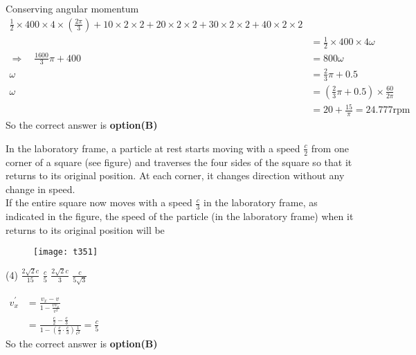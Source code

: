 \begin{questions}
\begin{answer}
	Conserving angular momentum\\
	$\begin{aligned} \frac{1}{2} \times 400 \times 4 \times\left(\frac{2 \pi}{3}\right)+10 \times 2 \times 2+20 \times 2 \times 2+30 \times 2 \times 2+40 \times 2 \times 2 \\ &=\frac{1}{2} \times 400 \times 4 \omega \\ \Rightarrow \quad \frac{1600}{3} \pi+400 &=800 \omega \\ \omega &=\frac{2}{3} \pi+0.5 \\ \omega &=\left(\frac{2}{3} \pi+0.5\right) \times \frac{60}{2 \pi} \\ &=20+\frac{15}{\pi}=24.777 \mathrm{rpm} \end{aligned}$\\
	So the correct answer is \textbf{option(B)}
\end{answer}
\begin{minipage}{\textwidth}
	\question In the laboratory frame, a particle at rest starts moving with a speed $\frac{c}{2}$ from one corner of a square (see figure) and traverses the four sides of the square so that it returns to its original position. At each corner, it changes direction without any change in speed.\\
	If the entire square now moves with a speed $\frac{c}{3}$ in the laboratory frame, as indicated in the figure, the speed of the particle (in the laboratory frame) when it returns to its original position will be
\end{minipage}
\begin{figure}[H]
	\centering
	\texttt{[image: t351]}
\end{figure}
\begin{tasks}(4)
	\task[\textbf{A.}] $\frac{2 \sqrt{2} c}{15}$
	\task[\textbf{B.}] $\frac{c}{5}$
	\task[\textbf{C.}]   $\frac{2 \sqrt{2} c}{3}$
	\task[\textbf{D.}] $\frac{c}{5 \sqrt{3}}$
\end{tasks}
\begin{answer}$\left. \right. $\\
	$\begin{aligned} v_{x}^{\prime} &=\frac{v_{x}-v}{1-\frac{v v_{x}}{v^{2}}} \\ &=\frac{\frac{c}{2}-\frac{c}{3}}{1-\left(\frac{c}{2} \cdot \frac{c}{3}\right) \frac{1}{c^{2}}}=\frac{c}{5} \end{aligned}$\\
	So the correct answer is \textbf{option(B)}
\end{answer}

\end{questions}
